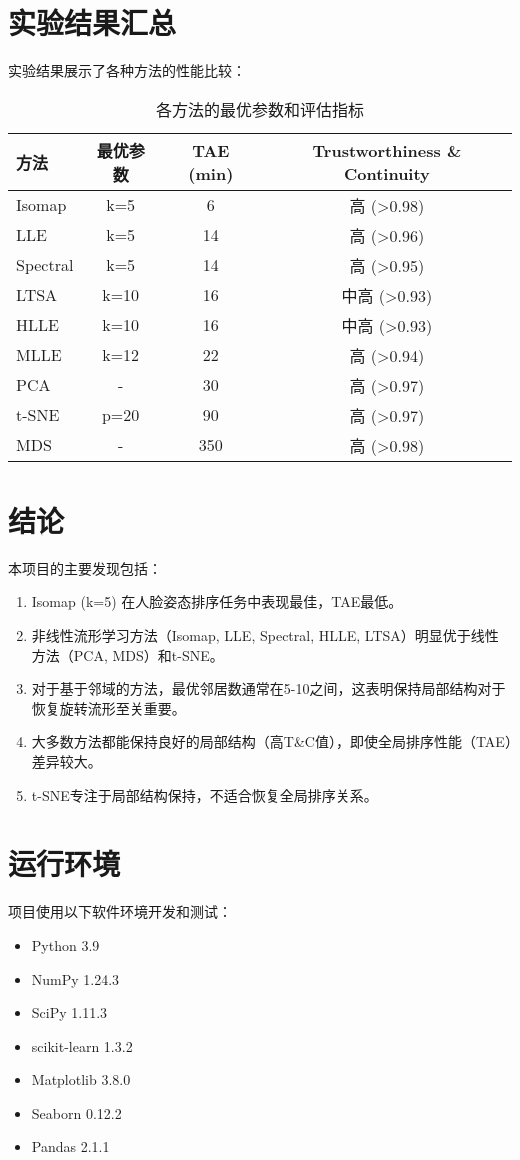 \documentclass{article}
\begin{document}
\section{实验结果汇总}

实验结果展示了各种方法的性能比较：

\begin{table}[h]
  \centering
  \caption{各方法的最优参数和评估指标}
  \begin{tabular}{lccc}
    \toprule
    方法 & 最优参数 & TAE (min) & Trustworthiness \& Continuity \\
    \midrule
    Isomap & k=5 & 6 & 高 (>0.98) \\
    LLE & k=5 & 14 & 高 (>0.96) \\
    Spectral & k=5 & 14 & 高 (>0.95) \\
    LTSA & k=10 & 16 & 中高 (>0.93) \\
    HLLE & k=10 & 16 & 中高 (>0.93) \\
    MLLE & k=12 & 22 & 高 (>0.94) \\
    PCA & - & 30 & 高 (>0.97) \\
    t-SNE & p=20 & 90 & 高 (>0.97) \\
    MDS & - & 350 & 高 (>0.98) \\
    \bottomrule
  \end{tabular}
\end{table}

\section{结论}

本项目的主要发现包括：

\begin{enumerate}
    \item Isomap (k=5) 在人脸姿态排序任务中表现最佳，TAE最低。
    \item 非线性流形学习方法（Isomap, LLE, Spectral, HLLE, LTSA）明显优于线性方法（PCA, MDS）和t-SNE。
    \item 对于基于邻域的方法，最优邻居数通常在5-10之间，这表明保持局部结构对于恢复旋转流形至关重要。
    \item 大多数方法都能保持良好的局部结构（高T\&C值），即使全局排序性能（TAE）差异较大。
    \item t-SNE专注于局部结构保持，不适合恢复全局排序关系。
\end{enumerate}

\section{运行环境}

项目使用以下软件环境开发和测试：

\begin{itemize}
    \item Python 3.9
    \item NumPy 1.24.3
    \item SciPy 1.11.3
    \item scikit-learn 1.3.2
    \item Matplotlib 3.8.0
    \item Seaborn 0.12.2
    \item Pandas 2.1.1
\end{itemize}
\end{document}
